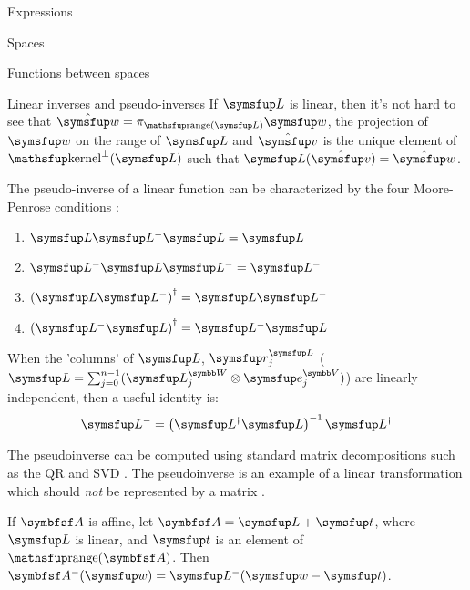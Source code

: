 \documentclass{PalisadesLakesArticle}
\begin{document}
\begin{plSection}{Expressions}
\begin{plSection}{Spaces}
\begin{plSection}{Functions between spaces}
\begin{plSection}{Linear inverses and pseudo-inverses}
If $\Vector{L}$ is linear, then it's not hard to see that
$\hat{\Vector{w}} = \pi_{\range(\Vector{L})} \Vector{w}$, the projection of $\Vector{w}$
on the range of $\Vector{L}$
and
$\hat{\Vector{v}}$ is the unique element of $\kernel^{\perp}(\Vector{L})$
such that $\Vector{L}(\hat{\Vector{v}}) = \hat{\Vector{w}}$.

The pseudo-inverse of a linear function can be characterized
by the four Moore-Penrose 
conditions :
\begin{enumerate}
\item $\Vector{L} \Vector{L}^{-} \Vector{L} = \Vector{L}$
\item $\Vector{L}^{-} \Vector{L} \Vector{L}^{-} = \Vector{L}^{-}$
\item $\left( \Vector{L} \Vector{L}^{-} \right)^{\dagger} = \Vector{L} \Vector{L}^{-}$
\item $\left( \Vector{L}^{-} \Vector{L} \right)^{\dagger} = \Vector{L}^{-} \Vector{L}$
\end{enumerate}

When the 'columns' of $\Vector{L}$, $\Vector{r}_j^{\Vector{L}}$
($\Vector{L} = \sum_{j=0}^{n-1} ( \Vector{L}_j^{\Space{W}} \otimes \Vector{e}_j^{\Space{V}} )$)
are linearly independent,
then a useful identity is:
\begin{equation}
\label{eq:full-rank-pseudo-inverse}
\Vector{L}^{-} = \left( \Vector{L}^{\dagger} \Vector{L} \right)^{-1} \Vector{L}^{\dagger}
\end{equation}

The pseudoinverse can be computed
using standard matrix decompositions such as
the QR and SVD .
The pseudoinverse is an example of a linear transformation
which should {\em not} be represented by a matrix
.

If $\Point{A}$ is affine,
let $\Point{A} = \Vector{L} + \Vector{t}$,
where $\Vector{L}$ is linear,
and $\Vector{t}$ is an element of $\range(\Point{A})$.
Then $\Point{A}^{-}(\Vector{w}) = \Vector{L}^{-}( \Vector{w} - \Vector{t} )$.
\end{plSection}%
\end{plSection}%
\end{plSection}%
\end{plSection}%
\end{document}

